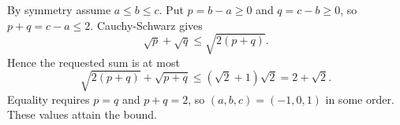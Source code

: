 By symmetry assume $a\le b\le c$. Put $p=b-a\ge0$ and $q=c-b\ge0$, so $p+q=c-a\le2$. Cauchy-Schwarz gives
\[
\sqrt p+\sqrt q\le\sqrt{2(p+q)}.
\]
Hence the requested sum is at most
\[
\sqrt{2(p+q)}+\sqrt{p+q}\le(\sqrt2+1)\sqrt2=2+\sqrt2.
\]
Equality requires $p=q$ and $p+q=2$, so $(a,b,c)=(-1,0,1)$ in some order. These values attain the bound.
